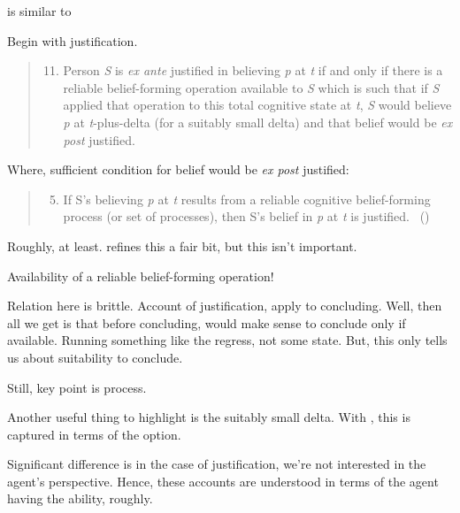 \begin{note}
  \citeauthor{Turri:2010aa} is similar to \citeauthor{Goldman:1979ui}

  Begin with justification.

  \begin{quote}
    \begin{enumerate}[label=(\arabic*)]
      \setcounter{enumi}{10}
    \item
      Person \emph{S} is \emph{ex ante} justified in believing \emph{p} at \emph{t} if and only if there is a reliable belief-forming operation available to \emph{S} which is such that if \emph{S} applied that operation to this total cognitive state at \emph{t}, \emph{S} would believe \emph{p} at \emph{t}-plus-delta (for a suitably small delta) and that belief would be \emph{ex post} justified.
    \end{enumerate}
  \end{quote}

  Where, sufficient condition for belief would be \emph{ex post} justified:
  \begin{quote}
    \begin{enumerate}[label=(\arabic*)]
      \setcounter{enumi}{4}
    \item
      If S's believing \emph{p} at \emph{t} results from a reliable cognitive belief-forming process (or set of processes), then S's belief in \emph{p} at \emph{t} is justified.%
      \mbox{ }\hfill\mbox{(\citeyear[13]{Goldman:1979ui})}
    \end{enumerate}
  \end{quote}
  Roughly, at least.
  \citeauthor{Goldman:1979ui} refines this a fair bit, but this isn't important.

  Availability of a reliable belief-forming operation!

  Relation here is brittle.
  Account of justification, apply to concluding.
  Well, then all we get is that before concluding, would make sense to conclude only if available.
  Running something like the \citeauthor{Carroll:1895uj} regress, not some state.
  But, this only tells us about suitability to conclude.

  Still, key point is process.

  Another useful thing to highlight is the suitably small delta.
  With \requ{}, this is captured in terms of the option.
\end{note}

\begin{note}
  Significant difference is in the case of justification, we're not interested in the agent's perspective.
  Hence, these accounts are understood in terms of the agent having the ability, roughly.
\end{note}

